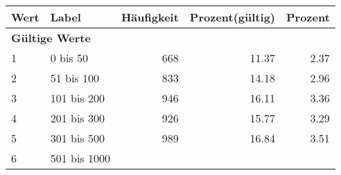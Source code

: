      \begin{longtable}{lXrrr}
     \toprule
     \textbf{Wert} & \textbf{Label} & \textbf{Häufigkeit} & \textbf{Prozent(gültig)} & \textbf{Prozent} \\
     \endhead
     \midrule
     \multicolumn{5}{l}{\textbf{Gültige Werte}}\\

     1 &
     \multicolumn{1}{X}{ 0 bis 50   } &


       \num{668} &
       \num[round-mode=places,round-precision=2]{11,37} &
         \num[round-mode=places,round-precision=2]{2,37} \\

     2 &
     \multicolumn{1}{X}{ 51 bis 100   } &


       \num{833} &
       \num[round-mode=places,round-precision=2]{14,18} &
         \num[round-mode=places,round-precision=2]{2,96} \\

     3 &
     \multicolumn{1}{X}{ 101 bis 200   } &


       \num{946} &
       \num[round-mode=places,round-precision=2]{16,11} &
         \num[round-mode=places,round-precision=2]{3,36} \\

     4 &
     \multicolumn{1}{X}{ 201 bis 300   } &


       \num{926} &
       \num[round-mode=places,round-precision=2]{15,77} &
         \num[round-mode=places,round-precision=2]{3,29} \\

     5 &
     \multicolumn{1}{X}{ 301 bis 500   } &


       \num{989} &
       \num[round-mode=places,round-precision=2]{16,84} &
         \num[round-mode=places,round-precision=2]{3,51} \\

     6 &
     \multicolumn{1}{X}{ 501 bis 1000   } &



\end{longtable}
